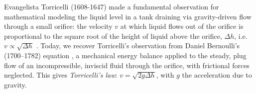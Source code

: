 \documentclass[openacc]{rsproca_new}%
\begin{document}


Evangelista Torricelli (1608-1647) made a fundamental observation for mathematical modeling the liquid level in a tank draining via gravity-driven flow through a small orifice: the velocity $v$ at which liquid flows out of the orifice is proportional to the square root of the height of liquid above the orifice, $\Delta h$, i.e. $v\propto \sqrt{\Delta h}$ \cite{mills1982newton}.
Today, we recover Torricelli's observation from Daniel Bernoulli's (1700–1782) equation \cite{welty2020fundamentals}, a mechanical energy balance applied to the steady, plug flow of an incompressible, inviscid fluid through the orifice, with frictional forces neglected. This gives \emph{Torricelli's law}: $v=\sqrt{2 g \Delta h}$, with $g$ the acceleration due to gravity. \cite{d2021torricelli,teoman2022discharge}
\end{document}
